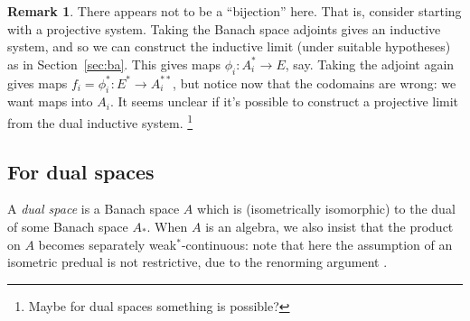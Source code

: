\documentclass[a4paper,11pt]{article}
\newcommand{\id}{\operatorname{id}}
\theoremstyle{definition}
\newtheorem{remark}[lemma]{Remark}
\begin{document}


\begin{remark}
There appears not to be a ``bijection'' here.  That is, consider starting with a projective system.  Taking the Banach space adjoints gives an inductive system, and so we can construct the inductive limit (under suitable hypotheses) as in Section~\ref{sec:ba}.  This gives maps $\phi_i \colon A_i^* \to E$, say.  Taking the adjoint again gives maps $f_i = \phi_i^* \colon E^* \to A_i^{**}$, but notice now that the codomains are wrong: we want maps into $A_i$.  It seems unclear if it's possible to construct a projective limit from the dual inductive system.
\footnote{Maybe for dual spaces something is possible?}
\end{remark}


\subsection{For dual spaces}\label{sec:dual}

A \emph{dual space} is a Banach space $A$ which is (isometrically isomorphic) to the dual of some Banach space $A_*$.  When $A$ is an algebra, we also insist that the product on $A$ becomes separately weak$^*$-continuous: note that here the assumption of an isometric predual is not restrictive, due to the renorming argument \cite[Proposition~2.1]{daws}.
\end{document}

